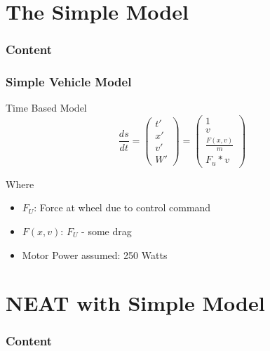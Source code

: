 \documentclass[8pt]{beamer}
\begin{document}
\section{The Simple Model}
\begin{frame}
	\frametitle{Content}
\end{frame}
\begin{frame}
	\frametitle{Simple Vehicle Model}
	\begin{block}{Time Based Model}	
	\[
	\frac{ds}{dt} = \left(
			\begin{array}{ll}
			t' \\
			x' \\
			v' \\
			W'
			\end{array}
		\right)
		= \left(
			\begin{array}{ll}
			1 \\
			v \\
			\frac{F(x,v)}{m} \\
			F_u * v
			\end{array}
		\right)
	\]
	
	Where\\
	\begin{itemize}
		\item $F_U$: Force at wheel due to control command
		\item $F(x,v)$: $F_U$ - some drag
		\item Motor Power assumed: 250 Watts
	\end{itemize}
	\end{block}

\end{frame}


\section{NEAT with Simple Model}
\begin{frame}
	\frametitle{Content}
\end{frame}
\end{document}
